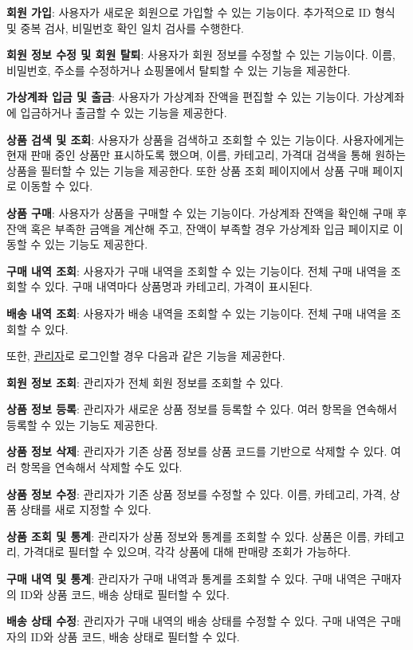 \documentclass[runningheads]{llncs}
\begin{document}
\textbf{회원 가입}:
	사용자가 새로운 회원으로 가입할 수 있는 기능이다. 추가적으로 ID 형식 및 중복 검사, 비밀번호 확인 일치 검사를 수행한다.
	
\textbf{회원 정보 수정 및 회원 탈퇴}:
	사용자가 회원 정보를 수정할 수 있는 기능이다. 이름, 비밀번호, 주소를 수정하거나 쇼핑몰에서 탈퇴할 수 있는 기능을 제공한다.
	
\textbf{가상계좌 입금 및 출금}:
	사용자가 가상계좌 잔액을 편집할 수 있는 기능이다. 가상계좌에 입금하거나 출금할 수 있는 기능을 제공한다.
	
\textbf{상품 검색 및 조회}:
	사용자가 상품을 검색하고 조회할 수 있는 기능이다. 사용자에게는 현재 판매 중인 상품만 표시하도록 했으며, 이름, 카테고리, 가격대 검색을 통해 원하는 상품을 필터할 수 있는 기능을 제공한다. 또한 상품 조회 페이지에서 상품 구매 페이지로 이동할 수 있다.
	
\textbf{상품 구매}:
	사용자가 상품을 구매할 수 있는 기능이다. 가상계좌 잔액을 확인해 구매 후 잔액 혹은 부족한 금액을 계산해 주고, 잔액이 부족할 경우 가상계좌 입금 페이지로 이동할 수 있는 기능도 제공한다.
	
\textbf{구매 내역 조회}:
	사용자가 구매 내역을 조회할 수 있는 기능이다. 전체 구매 내역을 조회할 수 있다. 구매 내역마다 상품명과 카테고리, 가격이 표시된다.
	
\textbf{배송 내역 조회}:
	사용자가 배송 내역을 조회할 수 있는 기능이다. 전체 구매 내역을 조회할 수 있다.
	
또한, \underline{관리자}로 로그인할 경우 다음과 같은 기능을 제공한다.

\textbf{회원 정보 조회}:
	관리자가 전체 회원 정보를 조회할 수 있다.
	
\textbf{상품 정보 등록}:
	관리자가 새로운 상품 정보를 등록할 수 있다. 여러 항목을 연속해서 등록할 수 있는 기능도 제공한다.
	
\textbf{상품 정보 삭제}:
	관리자가 기존 상품 정보를 상품 코드를 기반으로 삭제할 수 있다. 여러 항목을 연속해서 삭제할 수도 있다.
	
\textbf{상품 정보 수정}:
	관리자가 기존 상품 정보를 수정할 수 있다. 이름, 카테고리, 가격, 상품 상태를 새로 지정할 수 있다.
	
\textbf{상품 조회 및 통계}:
	관리자가 상품 정보와 통계를 조회할 수 있다. 상품은 이름, 카테고리, 가격대로 필터할 수 있으며, 각각 상품에 대해 판매량 조회가 가능하다.
	
\textbf{구매 내역 및 통계}:
	관리자가 구매 내역과 통계를 조회할 수 있다. 구매 내역은 구매자의 ID와 상품 코드, 배송 상태로 필터할 수 있다.

\textbf{배송 상태 수정}:
	관리자가 구매 내역의 배송 상태를 수정할 수 있다. 구매 내역은 구매자의 ID와 상품 코드, 배송 상태로 필터할 수 있다.
\end{document}
